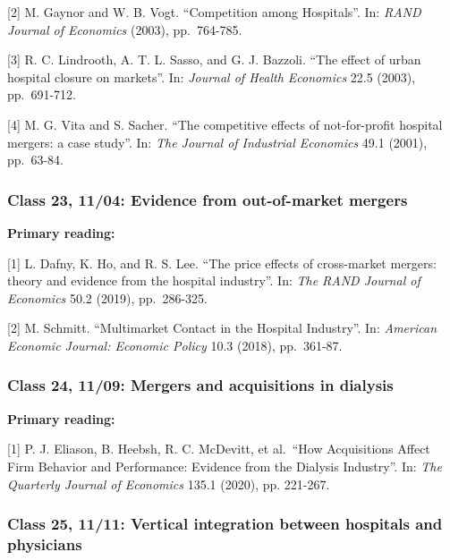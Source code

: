 \documentclass[11pt,]{article}
\begin{document}
{[}2{]} M. Gaynor and W. B. Vogt. ``Competition among Hospitals''. In:
\emph{RAND Journal of Economics} (2003), pp.~764-785.

{[}3{]} R. C. Lindrooth, A. T. L. Sasso, and G. J. Bazzoli. ``The effect
of urban hospital closure on markets''. In: \emph{Journal of Health
Economics} 22.5 (2003), pp.~691-712.

{[}4{]} M. G. Vita and S. Sacher. ``The competitive effects of
not-for-profit hospital mergers: a case study''. In: \emph{The Journal
of Industrial Economics} 49.1 (2001), pp.~63-84.

\hypertarget{class-23-1104-evidence-from-out-of-market-mergers}{%
\subsubsection{Class 23, 11/04: Evidence from out-of-market
mergers}\label{class-23-1104-evidence-from-out-of-market-mergers}}

\textbf{Primary reading:}

{[}1{]} L. Dafny, K. Ho, and R. S. Lee. ``The price effects of
cross-market mergers: theory and evidence from the hospital industry''.
In: \emph{The RAND Journal of Economics} 50.2 (2019), pp.~286-325.

{[}2{]} M. Schmitt. ``Multimarket Contact in the Hospital Industry''.
In: \emph{American Economic Journal: Economic Policy} 10.3 (2018),
pp.~361-87.

\hypertarget{class-24-1109-mergers-and-acquisitions-in-dialysis}{%
\subsubsection{Class 24, 11/09: Mergers and acquisitions in
dialysis}\label{class-24-1109-mergers-and-acquisitions-in-dialysis}}

\textbf{Primary reading:}

{[}1{]} P. J. Eliason, B. Heebsh, R. C. McDevitt, et al.~``How
Acquisitions Affect Firm Behavior and Performance: Evidence from the
Dialysis Industry''. In: \emph{The Quarterly Journal of Economics} 135.1
(2020), pp. 221-267.

\hypertarget{class-25-1111-vertical-integration-between-hospitals-and-physicians}{%
\subsubsection{Class 25, 11/11: Vertical integration between hospitals
and
physicians}\label{class-25-1111-vertical-integration-between-hospitals-and-physicians}}
\end{document}
